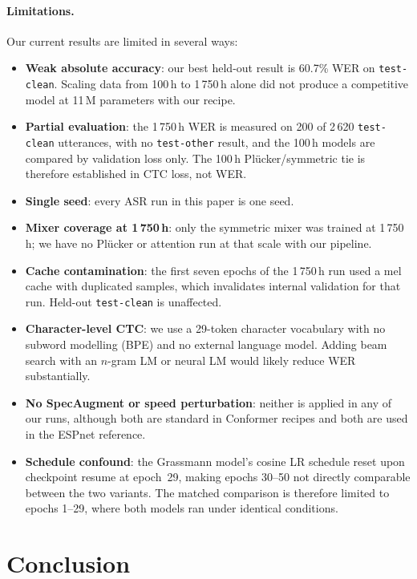 \documentclass[11pt,a4paper]{article}
\newcommand{\plucker}{Pl\"{u}cker}
\begin{document}
\paragraph{Limitations.}
Our current results are limited in several ways:
\begin{itemize}
  \item \textbf{Weak absolute accuracy}: our best held-out result is
    60.7\% WER on \texttt{test-clean}.  Scaling data from 100\,h to
    1\,750\,h alone did not produce a competitive model at 11\,M
    parameters with our recipe.
  \item \textbf{Partial evaluation}: the 1\,750\,h WER is measured on
    200 of 2\,620 \texttt{test-clean} utterances, with no
    \texttt{test-other} result, and the 100\,h models are compared by
    validation loss only.  The 100\,h \plucker{}/symmetric tie is
    therefore established in CTC loss, not WER.
  \item \textbf{Single seed}: every ASR run in this paper is one seed.
  \item \textbf{Mixer coverage at 1\,750\,h}: only the symmetric mixer
    was trained at 1\,750\,h; we have no \plucker{} or attention run at
    that scale with our pipeline.
  \item \textbf{Cache contamination}: the first seven epochs of the
    1\,750\,h run used a mel cache with duplicated samples, which
    invalidates internal validation for that run.  Held-out
    \texttt{test-clean} is unaffected.
  \item \textbf{Character-level CTC}: we use a 29-token character
    vocabulary with no subword modelling (BPE) and no external language
    model.  Adding beam search with an $n$-gram LM or neural LM would
    likely reduce WER substantially.
  \item \textbf{No SpecAugment or speed perturbation}: neither is
    applied in any of our runs, although both are standard in Conformer
    recipes and both are used in the ESPnet reference.
  \item \textbf{Schedule confound}: the Grassmann model's cosine LR
    schedule reset upon checkpoint resume at epoch~29, making epochs
    30--50 not directly comparable between the two variants.  The
    matched comparison is therefore limited to epochs 1--29, where both
    models ran under identical conditions.
\end{itemize}

\section{Conclusion}
\label{sec:conclusion}
\end{document}
